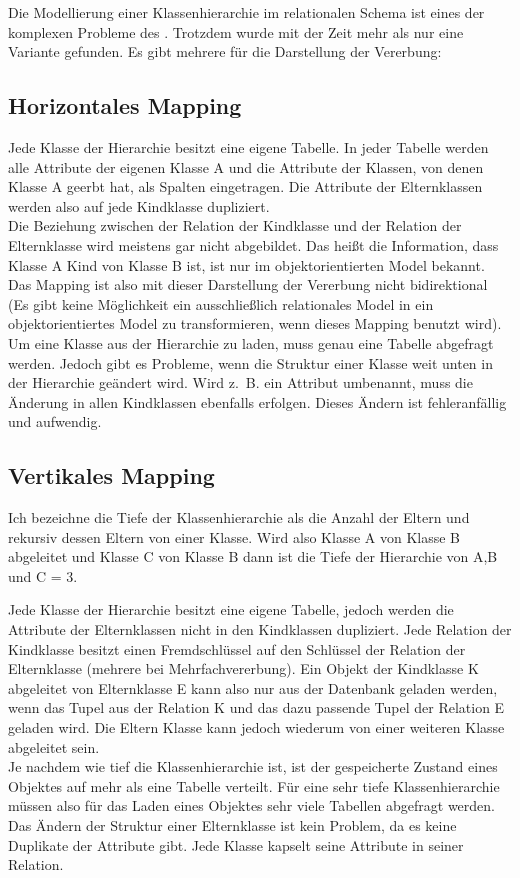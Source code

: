 Die Modellierung einer Klassenhierarchie im relationalen Schema ist eines der komplexen Probleme des \IM. Trotzdem wurde mit der Zeit mehr als nur eine Variante gefunden. Es gibt mehrere  für die Darstellung der Vererbung:\\

\subsection{Horizontales Mapping}
Jede Klasse der Hierarchie besitzt eine eigene Tabelle. In jeder Tabelle werden alle Attribute der eigenen Klasse A und die Attribute der Klassen, von denen Klasse A geerbt hat, als Spalten eingetragen. Die Attribute der Elternklassen werden also auf jede Kindklasse dupliziert.\\
Die Beziehung zwischen der Relation der Kindklasse und der Relation der Elternklasse wird meistens gar nicht abgebildet. Das heißt die Information, dass Klasse A Kind von Klasse B ist, ist nur im objektorientierten Model bekannt. Das Mapping ist also mit dieser Darstellung der Vererbung nicht bidirektional (Es gibt keine Möglichkeit ein ausschließlich relationales Model in ein objektorientiertes Model zu transformieren, wenn dieses Mapping benutzt wird). Um eine Klasse aus der Hierarchie zu laden, muss genau eine Tabelle abgefragt werden. Jedoch gibt es Probleme, wenn die Struktur einer Klasse weit unten in der Hierarchie geändert wird. Wird z.~B. ein Attribut umbenannt, muss die Änderung in allen Kindklassen ebenfalls erfolgen. Dieses Ändern ist fehleranfällig und aufwendig.

\subsection{Vertikales Mapping}
\begin{anmerkung}Ich bezeichne die Tiefe der Klassenhierarchie als die Anzahl der Eltern und rekursiv dessen Eltern von einer Klasse. Wird also Klasse A von Klasse B abgeleitet und Klasse C von Klasse B dann ist die Tiefe der Hierarchie von A,B und C = 3.
\end{anmerkung}
\noindent Jede Klasse der Hierarchie besitzt eine eigene Tabelle, jedoch werden die Attribute der Elternklassen nicht in den Kindklassen dupliziert. Jede Relation der Kindklasse besitzt einen Fremdschlüssel auf den Schlüssel der Relation der Elternklasse (mehrere bei Mehrfachvererbung). Ein Objekt der Kindklasse K abgeleitet von Elternklasse E kann also nur aus der Datenbank geladen werden, wenn das Tupel aus der Relation K und das dazu passende Tupel der Relation E geladen wird. Die Eltern Klasse kann jedoch wiederum von einer weiteren Klasse abgeleitet sein.\\
Je nachdem wie tief die Klassenhierarchie ist, ist der gespeicherte Zustand eines Objektes auf mehr als eine Tabelle verteilt. Für eine sehr tiefe Klassenhierarchie müssen also für das Laden eines Objektes sehr viele Tabellen abgefragt werden. Das Ändern der Struktur einer Elternklasse ist kein Problem, da es keine Duplikate der Attribute gibt. Jede Klasse kapselt seine Attribute in seiner Relation.\\

